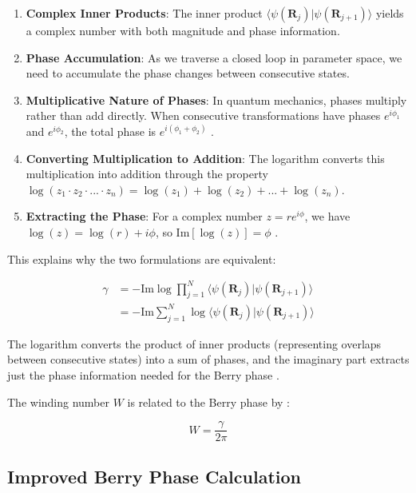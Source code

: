 \documentclass{article}
\begin{document}
\begin{enumerate}
    \item \textbf{Complex Inner Products}: The inner product $\langle \psi(\mathbf{R}_j) | \psi(\mathbf{R}_{j+1}) \rangle$ yields a complex number with both magnitude and phase information.
    
    \item \textbf{Phase Accumulation}: As we traverse a closed loop in parameter space, we need to accumulate the phase changes between consecutive states.
    
    \item \textbf{Multiplicative Nature of Phases}: In quantum mechanics, phases multiply rather than add directly. When consecutive transformations have phases $e^{i\phi_1}$ and $e^{i\phi_2}$, the total phase is $e^{i(\phi_1+\phi_2)}$ \cite{Griffiths2017}.
    
    \item \textbf{Converting Multiplication to Addition}: The logarithm converts this multiplication into addition through the property $\log(z_1 \cdot z_2 \cdot ... \cdot z_n) = \log(z_1) + \log(z_2) + ... + \log(z_n)$.
    
    \item \textbf{Extracting the Phase}: For a complex number $z = re^{i\phi}$, we have $\log(z) = \log(r) + i\phi$, so $\text{Im}[\log(z)] = \phi$ \cite{Bohm2003}.
\end{enumerate}

This explains why the two formulations are equivalent:

\begin{align}
\gamma &= -\text{Im} \log \prod_{j=1}^{N} \langle \psi(\mathbf{R}_j) | \psi(\mathbf{R}_{j+1}) \rangle \\
&= -\text{Im} \sum_{j=1}^{N} \log \langle \psi(\mathbf{R}_j) | \psi(\mathbf{R}_{j+1}) \rangle
\end{align}

The logarithm converts the product of inner products (representing overlaps between consecutive states) into a sum of phases, and the imaginary part extracts just the phase information needed for the Berry phase \cite{Resta2000, Bohm2003}.

The winding number $W$ is related to the Berry phase by \cite{Park2011, Liang2015}:

\begin{equation}
W = \frac{\gamma}{2\pi}
\end{equation}

\subsection{Improved Berry Phase Calculation}
\end{document}

